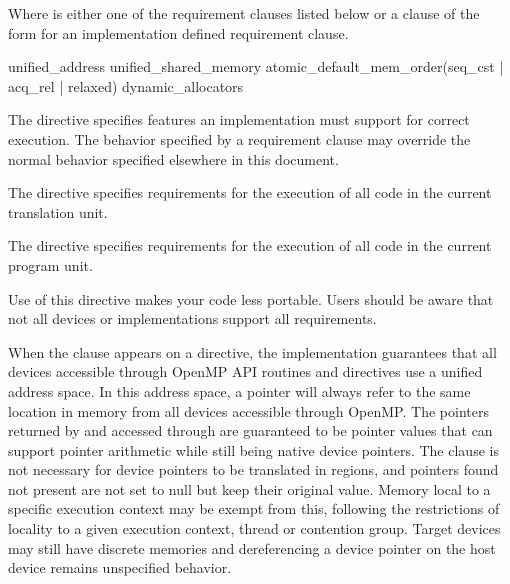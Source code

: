 Where  is either one of the requirement clauses listed below or a
clause of the form {} for an
implementation defined requirement clause.

\begin{indentedcodelist}
unified_address
unified_shared_memory
atomic_default_mem_order(seq_cst \textnormal{|} acq_rel \textnormal{|} relaxed)
dynamic_allocators
\end{indentedcodelist}

\descr

The  directive specifies features an implementation must
support for correct execution. The behavior specified by a requirement clause
may override the normal behavior specified elsewhere in this document.

\begin{ccppspecific}
The  directive specifies requirements for the execution of all
code in the current translation unit.
\end{ccppspecific}

\begin{fortranspecific}
The  directive specifies requirements for the execution of all
code in the current program unit.
\end{fortranspecific}

\begin{note}
Use of this directive makes your code less portable. Users should be aware that not all
devices or implementations support all requirements.
\end{note}

When the  clause appears on a 
directive, the implementation guarantees that all devices accessible through
OpenMP API routines and directives use a unified address space. In this
address space, a pointer will always refer to the same location in memory
from all devices accessible through OpenMP.  The pointers returned by
 and accessed through  are
guaranteed to be pointer values that can support pointer arithmetic while
still being native device pointers. The  clause is not
necessary for device pointers to be translated in  regions, and
pointers found not present are not set to null but keep their original value.
Memory local to a specific execution context may be exempt from this,
following the restrictions of locality to a given execution context, thread or
contention group.  Target devices may still have discrete memories and
dereferencing a device pointer on the host device remains unspecified
behavior.

